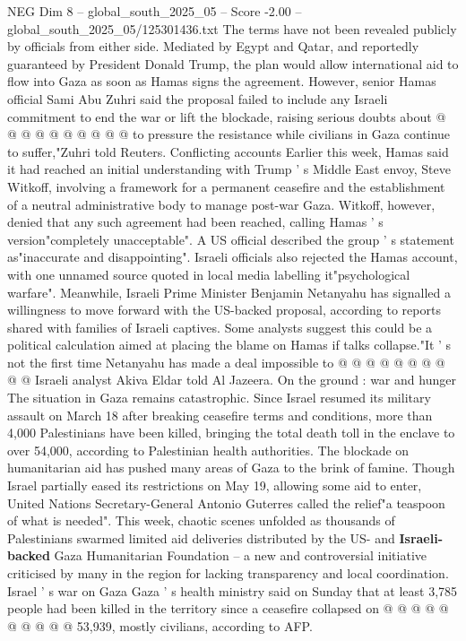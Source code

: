 \begin{textsample}{NEG Dim 8 – global\_south\_2025\_05 – Score -2.00 – global\_south\_2025\_05/125301436.txt}
The terms have not been revealed publicly by officials from either side.
Mediated by Egypt and Qatar, and reportedly guaranteed by President Donald Trump, the plan would allow international aid to flow into Gaza as soon as Hamas signs the agreement.
However, senior Hamas official Sami Abu Zuhri said the proposal failed to include any Israeli commitment to end the war or lift the blockade, raising serious doubts about @ @ @ @ @ @ @ @ @ @ to pressure the resistance while civilians in Gaza continue to suffer,"Zuhri told Reuters.
Conflicting accounts Earlier this week, Hamas said it had reached an initial understanding with Trump ' s Middle East envoy, Steve Witkoff, involving a framework for a permanent ceasefire and the establishment of a neutral administrative body to manage post-war Gaza.
Witkoff, however, denied that any such agreement had been reached, calling Hamas ' s version"completely unacceptable".
A US official described the group ' s statement as"inaccurate and disappointing".
Israeli officials also rejected the Hamas account, with one unnamed source quoted in local media labelling it"psychological warfare".
Meanwhile, Israeli Prime Minister Benjamin Netanyahu has signalled a willingness to move forward with the US-backed proposal, according to reports shared with families of Israeli captives.
Some analysts suggest this could be a political calculation aimed at placing the blame on Hamas if talks collapse."It ' s not the first time Netanyahu has made a deal impossible to @ @ @ @ @ @ @ @ @ @ Israeli analyst Akiva Eldar told Al Jazeera.
On the ground : war and hunger The situation in Gaza remains catastrophic.
Since Israel resumed its military assault on March 18 after breaking ceasefire terms and conditions, more than 4,000 Palestinians have been killed, bringing the total death toll in the enclave to over 54,000, according to Palestinian health authorities.
The blockade on humanitarian aid has pushed many areas of Gaza to the brink of famine.
Though Israel partially eased its restrictions on May 19, allowing some aid to enter, United Nations Secretary-General Antonio Guterres called the relief"a teaspoon of what is needed".
This week, chaotic scenes unfolded as thousands of Palestinians swarmed limited aid deliveries distributed by the US- and \textbf{Israeli-backed} Gaza Humanitarian Foundation -- a new and controversial initiative criticised by many in the region for lacking transparency and local coordination.
Israel ' s war on Gaza Gaza ' s health ministry said on Sunday that at least 3,785 people had been killed in the territory since a ceasefire collapsed on @ @ @ @ @ @ @ @ @ @ 53,939, mostly civilians, according to AFP.

\end{textsample}
